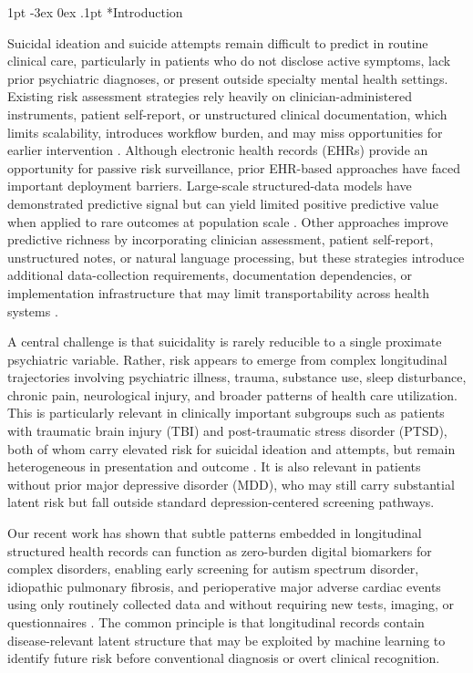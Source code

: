 \documentclass[onecolumn, compsoc,11pt]{IEEEtran}
\makeatletter
\renewcommand\section{\@startsection {section}{1}{\z@}
  {1pt \@plus -3ex \@minus 0ex}
  {.1pt}
  {\large\bfseries\scshape\color{black!70}}}
\makeatother
\begin{document}
\vspace{20pt}
\section*{Introduction}

Suicidal ideation and suicide attempts remain difficult to predict in routine clinical care, particularly in patients who do not disclose active symptoms, lack prior psychiatric diagnoses, or present outside specialty mental health settings. Existing risk assessment strategies rely heavily on clinician-administered instruments, patient self-report, or unstructured clinical documentation, which limits scalability, introduces workflow burden, and may miss opportunities for earlier intervention \cite{nock2017psychological,tang2022people,fowler2022suicide}. Although electronic health records (EHRs) provide an opportunity for passive risk surveillance, prior EHR-based approaches have faced important deployment barriers. Large-scale structured-data models have demonstrated predictive signal but can yield limited positive predictive value when applied to rare outcomes at population scale \cite{simon2018predicting,belsher2019prediction}. Other approaches improve predictive richness by incorporating clinician assessment, patient self-report, unstructured notes, or natural language processing, but these strategies introduce additional data-collection requirements, documentation dependencies, or implementation infrastructure that may limit transportability across health systems \cite{tsui2021natural,walsh2021predicting,barakcorren2020validation}.

A central challenge is that suicidality is rarely reducible to a single proximate psychiatric variable. Rather, risk appears to emerge from complex longitudinal trajectories involving psychiatric illness, trauma, substance use, sleep disturbance, chronic pain, neurological injury, and broader patterns of health care utilization. This is particularly relevant in clinically important subgroups such as patients with traumatic brain injury (TBI) and post-traumatic stress disorder (PTSD), both of whom carry elevated risk for suicidal ideation and attempts, but remain heterogeneous in presentation and outcome \cite{nock2017psychological}. It is also relevant in patients without prior major depressive disorder (MDD), who may still carry substantial latent risk but fall outside standard depression-centered screening pathways.

Our recent work has shown that subtle patterns embedded in longitudinal structured health records can function as zero-burden digital biomarkers for complex disorders, enabling early screening for autism spectrum disorder, idiopathic pulmonary fibrosis, and perioperative major adverse cardiac events using only routinely collected data and without requiring new tests, imaging, or questionnaires \cite{onishchenko2021reduced,onishchenko2022screening,JAHA2022}. The common principle is that longitudinal records contain disease-relevant latent structure that may be exploited by machine learning to identify future risk before conventional diagnosis or overt clinical recognition.
\end{document}
